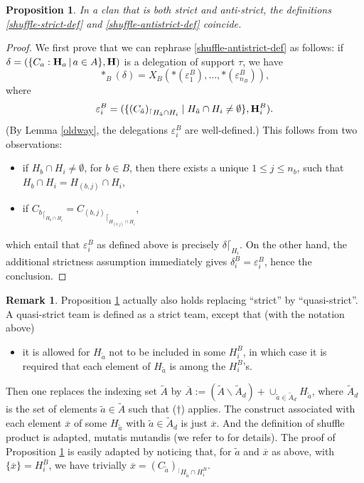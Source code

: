 \documentclass{article}
\theoremstyle{plain}
\newtheorem{proposition}[thm]{Proposition}
\theoremstyle{definition}
\newtheorem{remark}[thm]{Remark}
\newcommand{\union}{\cup}
\newcommand{\set}[1]{\{#1\}}
\newcommand{\setc}[2]{\set{#1 \mid #2}}
\newcommand{\inter}{\cap}
\newcommand{\hyper}[1]{{\bf #1}}
\newcommand{\restrconstr}[2]{{#1}_{{}^\lceil {#2}}}
\begin{document}
\begin{proposition} \label{strict-antistrict-agree}
In a clan that is both strict and anti-strict, the definitions  \eqref{shuffle-strict-def} and
\eqref{shuffle-antistrict-def} coincide.
\end{proposition}
\begin{proof}  We first prove that 
we can rephrase \eqref{shuffle-antistrict-def} as follows: if $\delta = (\{C_a:{\bf H}_a\,|\, a\in A\},{\bf H})$ is a delegation of support $\tau$, we have
$$\ast_B(\delta)=X_B(\ast(\varepsilon_1^B),\ldots,\ast(\varepsilon_{n_B}^B)),$$ where $$\varepsilon_i^B=(\setc{\restrconstr{(C_{\tilde a})}{H_{\tilde{a}}\inter H_i}}{H_{\tilde{a}}\inter H_i\neq\emptyset},\hyper{H}_i^B).$$ (By Lemma \ref{oldway}, the delegations $\varepsilon_i^B$ are well-defined.) This follows from two observations:
\begin{itemize}
\item if $H_b\cap H_i\neq\emptyset$, for $b\in B$, then there exists a unique $1\leq j\leq n_b$, such that $H_b\cap H_i=H_{(b,j)}\cap H_i$,
\item if ${C_b}_{\lceil_{H_b\cap H_i}}={C_{(b,j)}}_{\lceil_{H_{(b,j)}\cap H_i}}$,
\end{itemize} 
which entail that $\varepsilon_i^B$ as defined above is precisely $\delta\lceil_{H_i}$. 
On the other hand, the additional strictness assumption immediately gives $\delta_i^B=\varepsilon_i^B$, hence the conclusion.
\end{proof}

\begin{remark} \label{quasi-strict-and-antistrict}
Proposition
\ref{strict-antistrict-agree} actually also holds replacing ``strict'' by ``quasi-strict''.   A quasi-strict team is defined as a strict team, except that (with the notation above)
\begin{itemize}
\item[$(\dagger)$]  it is allowed for $H_{\tilde{a}}$ not to be included in some $H_i^B$, in which case it is required that each element of $H_{\tilde{a}}$ is  among the $H_i^B$'s. 
\end{itemize}  Then one replaces the indexing set $\tilde{A}$ by 
$\overline{A}:=(\tilde{A}\backslash \tilde{A}_d) + \union_{\tilde{a}\in \tilde{A}_d} H_{\tilde{a}}$, where
$\tilde{A}_d$ is the set of elements $\tilde{a}\in \tilde{A}$ such that  ($\dagger$) applies.  The construct associated with each element $\overline{x}$ of some $H_{\tilde{a}}$ with $\tilde{a}\in\tilde{A}_d$ is just $\overline{x}$.
And the definition of shuffle product is adapted, mutatis mutandis (we refer to \cite{PLBJ1} for details). The proof of Proposition  \ref{strict-antistrict-agree} is easily adapted by noticing that, for $\tilde{a}$ and $\overline{x}$ as above, with $\set{\overline{x}}=H_i^B$, we have trivially $\overline{x}=\restrconstr{(C_{\tilde{a}})}{H_{\tilde{a}}\cap H_i^B}$.
\end{remark}
\end{document}
